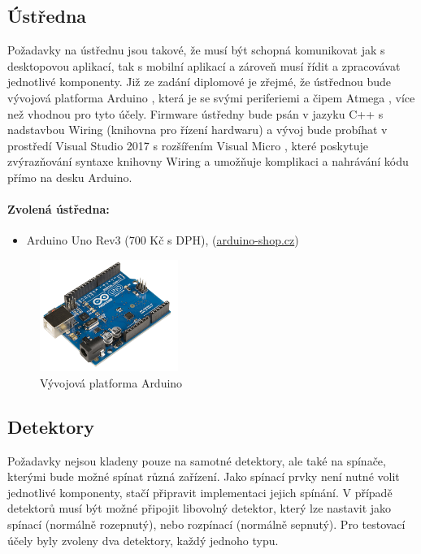 \documentclass[FM,DP]{tulthesis}  %
\begin{document}
\subsection{Ústředna}
Požadavky na ústřednu jsou takové, že musí být schopná komunikovat jak s desktopovou aplikací, tak s mobilní aplikací a zároveň musí řídit a zpracovávat jednotlivé komponenty. Již ze zadání diplomové je zřejmé, že ústřednou bude vývojová platforma Arduino \cite{Pruvodce arduinem}, která je se svými periferiemi \cite{Arduino schematic} a čipem Atmega \cite{Atmega datasheet}, více než vhodnou pro tyto účely. Firmware ústředny bude psán v jazyku  C++ s nadstavbou Wiring (knihovna pro řízení hardwaru) \cite{Wiring} a vývoj bude probíhat v prostředí Visual Studio 2017 s rozšířením Visual Micro \cite{Visual Micro}, které poskytuje zvýrazňování syntaxe knihovny Wiring a umožňuje komplikaci a nahrávání kódu přímo na desku Arduino.

\paragraph{Zvolená ústředna:}
\begin{itemize}
\item Arduino Uno Rev3 (700 Kč s DPH), (\url{arduino-shop.cz})
\end{itemize}

\begin{figure}[H]
\begin{center}
\includegraphics[width=0.4\textwidth]{images/arduino.png}
\caption{Vývojová platforma Arduino}
\label{image}
\end{center}
\end{figure}

\subsection{Detektory}
Požadavky nejsou kladeny pouze na samotné detektory, ale také na spínače, kterými bude možné spínat různá zařízení. Jako spínací prvky není nutné volit jednotlivé komponenty, stačí připravit implementaci jejich spínání. V případě detektorů musí být možné připojit libovolný detektor, který lze nastavit jako spínací (normálně rozepnutý), nebo rozpínací (normálně sepnutý). Pro testovací účely byly zvoleny dva detektory, každý jednoho typu.
\end{document}

